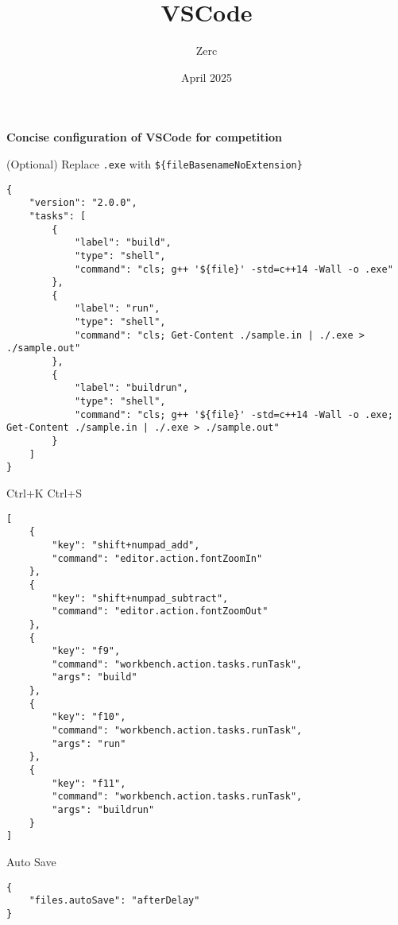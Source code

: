 \documentclass{article}
\title{VSCode}
\author{Zerc}
\date{April 2025}
\begin{document}
\pagestyle{empty}
\begin{center}
    \Large\textbf{Concise configuration of VSCode for competition}
\end{center}

\hfill

 (Optional) Replace \texttt{.exe} with \texttt{\$\{fileBasenameNoExtension\}}

\begin{lstlisting}
{
    "version": "2.0.0",
    "tasks": [
        {
            "label": "build",
            "type": "shell",
            "command": "cls; g++ '${file}' -std=c++14 -Wall -o .exe"
        },
        {
            "label": "run",
            "type": "shell",
            "command": "cls; Get-Content ./sample.in | ./.exe > ./sample.out"
        },
        {
            "label": "buildrun",
            "type": "shell",
            "command": "cls; g++ '${file}' -std=c++14 -Wall -o .exe; Get-Content ./sample.in | ./.exe > ./sample.out"
        }
    ]
}
\end{lstlisting}

 Ctrl+K Ctrl+S


\begin{lstlisting}
[
    {
        "key": "shift+numpad_add",
        "command": "editor.action.fontZoomIn"
    },
    {
        "key": "shift+numpad_subtract",
        "command": "editor.action.fontZoomOut"
    },
    {
        "key": "f9",
        "command": "workbench.action.tasks.runTask",
        "args": "build"
    },
    {
        "key": "f10",
        "command": "workbench.action.tasks.runTask",
        "args": "run"
    },
    {
        "key": "f11",
        "command": "workbench.action.tasks.runTask",
        "args": "buildrun"
    }
]
\end{lstlisting}

 Auto Save


\begin{lstlisting}
{
    "files.autoSave": "afterDelay"
}
\end{lstlisting}
\end{document}
